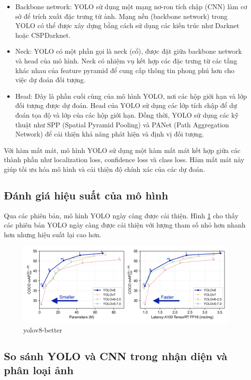 \begin{itemize}
    \item Backbone network: YOLO sử dụng một mạng nơ-ron tích chập (CNN) làm cơ sở để trích xuất đặc trưng từ ảnh. Mạng nền (backbone network) trong YOLO có thể được xây dựng bằng cách sử dụng các kiến trúc như Darknet hoặc CSPDarknet.
    \item Neck: YOLO có một phần gọi là neck (cổ), được đặt giữa backbone network và head của mô hình. Neck có nhiệm vụ kết hợp các đặc trưng từ các tầng khác nhau của feature pyramid để cung cấp thông tin phong phú hơn cho việc dự đoán đối tượng.
    \item Head: Đây là phần cuối cùng của mô hình YOLO, nơi các hộp giới hạn và lớp đối tượng được dự đoán. Head của YOLO sử dụng các lớp tích chập để dự đoán tọa độ và lớp của các hộp giới hạn. Đồng thời, YOLO sử dụng các kỹ thuật như SPP (Spatial Pyramid Pooling) và PANet (Path Aggregation Network) để cải thiện khả năng phát hiện và định vị đối tượng.
\end{itemize}

Với hàm mất mát, mô hình YOLO sử dụng một hàm mất mát kết hợp giữa các thành phần như localization loss, confidence loss và class loss. Hàm mất mát này giúp tối ưu hóa mô hình và cải thiện độ chính xác của các dự đoán.

\subsection{Đánh giá hiệu suất của mô hình}

Qua các phiên bản, mô hình YOLO ngày càng được cải thiện. Hình \ref{fig:yolov8-better} cho thấy các phiên bản YOLO ngày càng được cải thiện với lượng tham số nhỏ hơn nhanh hơn nhưng hiệu suất lại cao hơn.

\begin{figure}
    \centering
    \includegraphics[width=0.75\linewidth]{images/yolov8-better.png}
    \caption{yolov8-better}
    \label{fig:yolov8-better}
\end{figure}
\subsection{So sánh YOLO và CNN trong nhận diện và phân loại ảnh}


